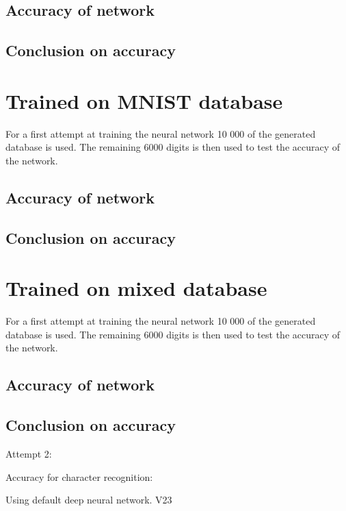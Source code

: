 \subsection{Accuracy of network}

\subsection{Conclusion on accuracy}

\section{Trained on MNIST database}
For a first attempt at training the neural network 10 000 of the generated database is used. The remaining 6000 digits is then used to test the accuracy of the network.

\subsection{Accuracy of network}

\subsection{Conclusion on accuracy}


\section{Trained on mixed database}
For a first attempt at training the neural network 10 000 of the generated database is used. The remaining 6000 digits is then used to test the accuracy of the network.

\subsection{Accuracy of network}

\subsection{Conclusion on accuracy}











Attempt 2:

Accuracy for character recognition:

Using default deep neural network. V23


